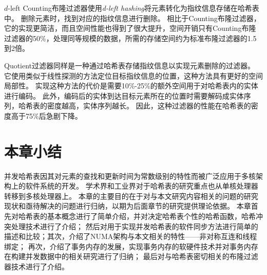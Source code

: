 $d$-left Counting布隆过滤器\cite{bonomi2006improved}使用\textit{d-left hashing}\cite{mitzenmacher1999asymptotics}将元素转化为指纹信息存储在哈希表中。
删除元素时，找到对应的指纹信息进行删除。
相比于Counting布隆过滤器，它的实现更简洁，而且空间性能也得到了很大提升，空间开销只有Counting布隆过滤器的50\%，处理同等规模的数据，所需的存储空间约为标准布隆过滤器的1.5到2倍。


Quotient过滤器\cite{bender2012don}同样是一种通过哈希表存储指纹信息以实现元素删除的过滤器。
它使用类似于线性探测的方法定位目标指纹信息的位置，这种方法具有更好的空间局部性。
实现这种方法的代价是需要10\%-25\%的额外空间用于对哈希表内的实体进行编码。
此外，编码后的实体到达目标元素所在的位置时需要解码成实体序列，哈希表的密度越高，实体序列越长。
因此，这种过滤器的性能在哈希表的密度高于75\%后急剧下降。

\section{本章小结}
并发哈希表因其对元素的查找和更新时间为常数级别的特性而被广泛应用于多核架构上的软件系统的开发。
学术界和工业界对于哈希表的研究重点也从单核处理器转移到多核处理器上。
本章的主要目的在于对与本文研究内容相关的问题的研究现状和亟待解决的问题进行归纳，以期为后面章节的研究提供理论依据。
本章首先对哈希表的基本概念进行了简单介绍，并对决定哈希表个性的哈希函数，哈希冲突处理技术进行了介绍；
然后对用于实现并发哈希表的软件同步方法进行简单的描述和比较；其次，介绍了NUMA架构与本文相关的特性——非对称互连和线程绑定；
再次，介绍了事务内存的发展，实现事务内存的软硬件技术并对事务内存在构建并发数据中的相关研究进行了归纳；
最后对与哈希表密切相关的布隆过滤器技术进行了介绍。


